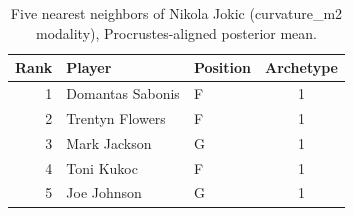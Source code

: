 \begin{table}[htbp]
  \centering\small
  \begin{tabular}{rllc}
    \toprule
    Rank & Player & Position & Archetype \\
    \midrule
    1 & Domantas Sabonis & F & 1 \\
    2 & Trentyn Flowers & F & 1 \\
    3 & Mark Jackson & G & 1 \\
    4 & Toni Kukoc & F & 1 \\
    5 & Joe Johnson & G & 1 \\
    \bottomrule
  \end{tabular}
  \caption{Five nearest neighbors of Nikola Jokic (curvature_m2 modality), Procrustes-aligned posterior mean.}
  \label{tab:Nikola_Jokic_neighbors_curvature_m2}
\end{table}

